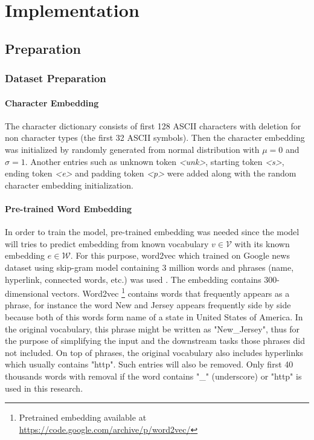 \chapter{Implementation}
\label{chap:implementation}

\section{Preparation}
    \subsection{Dataset Preparation}
        \subsubsection{Character Embedding}
            The character dictionary consists of first 128 ASCII
            characters with deletion for non character types (the
            first 32 ASCII symbols). Then the character embedding was
            initialized by randomly generated from normal distribution
            with $\mu = 0$ and $\sigma = 1$. Another entries such as
            unknown token \textit{\textless unk\textgreater}, starting
            token \textit{\textless s\textgreater}, ending token
            \textit{\textless e\textgreater} and padding token
            \textit{\textless p\textgreater} were added along with the
            random character embedding initialization.

        \subsubsection{Pre-trained Word Embedding}
            In order to train the model, pre-trained embedding was
            needed since the model will tries to predict embedding
            from known vocabulary $v \in \mathcal{V}$ with its known
            embedding $e \in \mathcal{W}$. For this purpose, word2vec
            which trained on Google news dataset using skip-gram model
            containing 3 million words and phrases (name, hyperlink,
            connected words, etc.) was used
            \citep{Distributed2013mikolov}. The embedding contains
            300-dimensional vectors. Word2vec \footnote{Pretrained
            embedding available at 
            \url{https://code.google.com/archive/p/word2vec/}}
            contains words that frequently appears as a phrase, for
            instance the word New and Jersey appears frequently side
            by side because both of this words form name of a state in
            United States of America. In the original vocabulary, this
            phrase might be written as "New\_Jersey", thus for the
            purpose of simplifying the input and the downstream tasks
            those phrases did not included. On top of phrases, the
            original vocabulary also includes hyperlinks which usually
            contains "http". Such entries will also be removed. Only
            first 40 thousands words with removal if the word contains
            "\_" (underscore) or "http" is used in this research.
            
